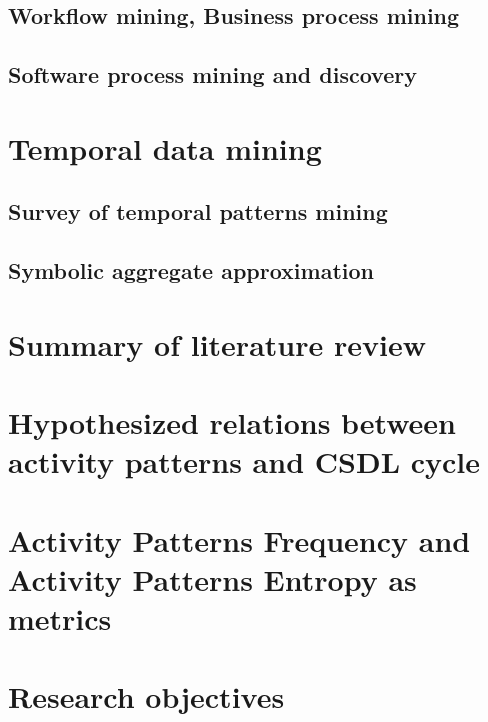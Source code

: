 \subsection{Workflow mining, Business process mining}\label{mackground.bpm}


\subsection{Software process mining and discovery}\label{mackground.bpm}


\section{Temporal data mining}
\subsection{Survey of temporal patterns mining}
\subsection{Symbolic aggregate approximation}

\section{Summary of literature review}

\section{Hypothesized relations between activity patterns and CSDL cycle}

\section{Activity Patterns Frequency and Activity Patterns Entropy as metrics}

\section{Research objectives}